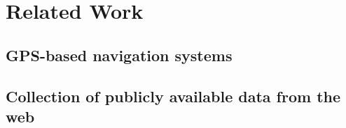 \chapter{Related Work}
\label{cha:relatedwork}
\section{GPS-based navigation systems}

\section{Collection of publicly available data from the web}
\cite{FakePaper11}
\cite{FakeWebPage11}

% 
% 
% 
% 
% 
% 

